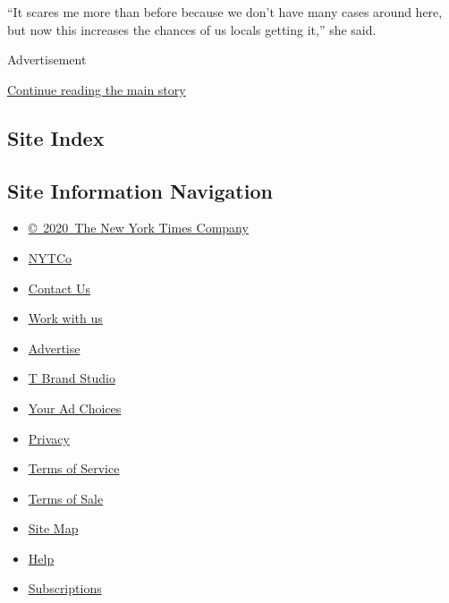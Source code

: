 ``It scares me more than before because we don't have many cases around
here, but now this increases the chances of us locals getting it,'' she
said.

Advertisement

\protect\hyperlink{after-bottom}{Continue reading the main story}

\hypertarget{site-index}{%
\subsection{Site Index}\label{site-index}}

\hypertarget{site-information-navigation}{%
\subsection{Site Information
Navigation}\label{site-information-navigation}}

\begin{itemize}
\tightlist
\item
  \href{https://help.nytimes.com/hc/en-us/articles/115014792127-Copyright-notice}{©~2020~The
  New York Times Company}
\end{itemize}

\begin{itemize}
\tightlist
\item
  \href{https://www.nytco.com/}{NYTCo}
\item
  \href{https://help.nytimes.com/hc/en-us/articles/115015385887-Contact-Us}{Contact
  Us}
\item
  \href{https://www.nytco.com/careers/}{Work with us}
\item
  \href{https://nytmediakit.com/}{Advertise}
\item
  \href{http://www.tbrandstudio.com/}{T Brand Studio}
\item
  \href{https://www.nytimes.com/privacy/cookie-policy\#how-do-i-manage-trackers}{Your
  Ad Choices}
\item
  \href{https://www.nytimes.com/privacy}{Privacy}
\item
  \href{https://help.nytimes.com/hc/en-us/articles/115014893428-Terms-of-service}{Terms
  of Service}
\item
  \href{https://help.nytimes.com/hc/en-us/articles/115014893968-Terms-of-sale}{Terms
  of Sale}
\item
  \href{https://spiderbites.nytimes.com}{Site Map}
\item
  \href{https://help.nytimes.com/hc/en-us}{Help}
\item
  \href{https://www.nytimes.com/subscription?campaignId=37WXW}{Subscriptions}
\end{itemize}
